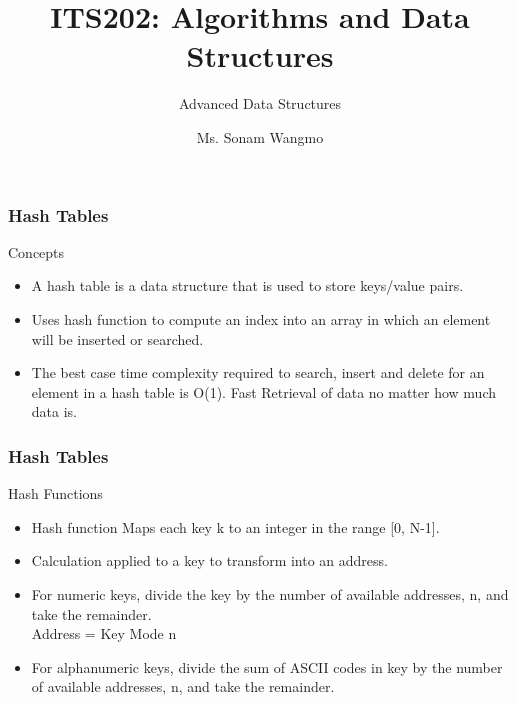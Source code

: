 \documentclass[11pt]{beamer}
\begin{document}
	\author{Ms. Sonam Wangmo}
	\title{ITS202: Algorithms and Data Structures}
	\subtitle{Advanced Data Structures}
	\institute{
		\textcolor{blue}{Gyalpozhing College of Information Technology \\ Royal University of Bhutan} \\
		\vspace{0.5cm}
	}
	\begin{frame}[plain]
		\maketitle 
	\end{frame}
	
	\begin{frame}
		\frametitle{Hash Tables}
		\begin{block}{Concepts}
			\begin{itemize}
				\item A hash table is a data structure that is used to store keys/value pairs. 
				\item Uses hash function to compute an index into an array in which an element will be inserted or searched. 
				\item The best case time complexity required to search, insert and delete for an element in a hash table is O(1). Fast Retrieval of data no matter how much data is.
			\end{itemize}
		\end{block}
	\end{frame}

     \begin{frame}
     	\frametitle{Hash Tables}
     	\begin{block}{Hash Functions}
     		\begin{itemize}
     		  \item Hash function Maps each key k to an integer in the range [0, N-1]. 
     		  \item Calculation applied to a key to transform into an address.
     		  \item For numeric keys, divide the key by the number of available addresses, n, and take the remainder.\\
     		  \alert{ Address = Key Mode n}
     		  \item For alphanumeric keys, divide the sum of ASCII codes in key by the number of available addresses, n, and take the remainder.     		  
     		\end{itemize}
     	\end{block}
     \end{frame}
 
\end{document}
